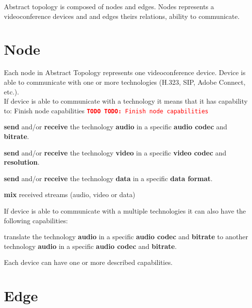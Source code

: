 \documentclass[a4paper]{report}
\newcommand{\TODO}[1]{%
\def\empty{}%
\def\prvniparametr{#1}%
\ifx\prvniparametr\empty%
\begingroup\tt\textcolor{red}{\noindent\textbf{TODO}}\endgroup
\else%
\begingroup\tt\textcolor{red}{\noindent\textbf{TODO:}\ #1}\endgroup
\fi%
}
\begin{document}
Abstract topology is composed of nodes and edges. Nodes represents a videoconference devices and and edges theirs relations, ability to communicate.

\section{Node}

Each node in Abstract Topology represents one videoconference device. Device is able to communicate with one or more technologies (H.323, SIP, Adobe Connect, etc.).
\\ 
If device is able to communicate with a technology it means that it has capability to:
\TODO{Finish node capabilities}
\begin{compactitem}

\item \textbf{send} and/or \textbf{receive} the technology \textbf{audio} in a specific \textbf{audio codec} and \textbf{bitrate}.
\item \textbf{send} and/or \textbf{receive} the technology \textbf{video} in a specific \textbf{video codec} and \textbf{resolution}.
\item \textbf{send} and/or \textbf{receive} the technology \textbf{data} in a specific \textbf{data format}.
\item \textbf{mix} received streams (audio, video or data)
\end{compactitem}
If device is able to communicate with a multiple technologies it can also have the following capabilities:
\begin{compactitem}
\item translate the technology \textbf{audio} in a specific \textbf{audio codec} and \textbf{bitrate} to another technology \textbf{audio} in a specific \textbf{audio codec} and \textbf{bitrate}.
\end{compactitem}

Each device can have one or more described capabilities.
   

\section{Edge}
\end{document}
